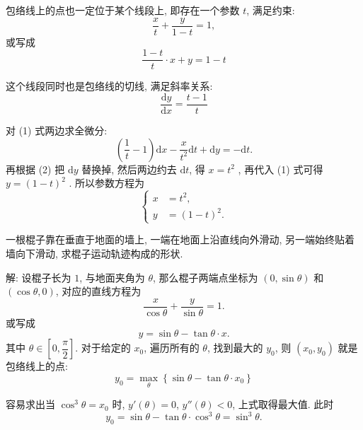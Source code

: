 包络线上的点也一定位于某个线段上, 即存在一个参数 $t$, 满足约束:
\[ \frac{x}{t}+\frac{y}{1-t} = 1 ,\]
或写成
\[ \frac{1-t}{t}\cdot x + y = 1-t \tag{1}\]

这个线段同时也是包络线的切线, 满足斜率关系:
\[ \frac{\mathrm{d}y}{\mathrm{d}x} = \frac{t-1}{t} \tag{2} \]

对 (1) 式两边求全微分:
\[ (\frac{1}{t}-1)\mathrm{d}x - \frac{x}{t^2}\mathrm{d}t  + \mathrm{d} y = -\mathrm{d}t .\]
再根据 (2) 把 $\mathrm{d}y$ 替换掉, 然后两边约去 $\mathrm{d}t$, 得 $ x = t^2$ , 再代入 (1) 式可得 $ y = (1-t)^2 $ .
所以参数方程为
\[ \begin{cases}
x &= t^2, \\
y &= (1-t)^2 .
\end{cases}\]

\newpage

一根棍子靠在垂直于地面的墙上, 一端在地面上沿直线向外滑动, 另一端始终贴着墙向下滑动, 求棍子运动轨迹构成的形状.
\begin{figure*}[htbp]
\centering
{}
\end{figure*}

解: 设棍子长为 $1$, 与地面夹角为 $\theta$, 那么棍子两端点坐标为 $(0,\sin\theta)$ 和 $(\cos\theta,0)$, 对应的直线方程为 
\[ \frac{x}{\cos\theta} + \frac{y}{\sin\theta} = 1 .\]
或写成
\[y = \sin\theta - \tan\theta\cdot x .\]
其中 $\theta\in[0,\dfrac{\pi}{2}]$. 对于给定的 $x_0$, 遍历所有的 $\theta$, 找到最大的 $y_0$, 则 $(x_0, y_0)$ 就是包络线上的点:
\[y_0 = \mathop{\max}_{\theta}\left\{ \sin\theta - \tan\theta\cdot x_0 \right\}\]

容易求出当 $\cos^3\theta = x_0$ 时, $y'(\theta) = 0$, $y''(\theta) < 0$, 上式取得最大值. 此时 
\[ y_0 = \sin\theta - \tan\theta\cdot\cos^3\theta = \sin^3\theta.\]

